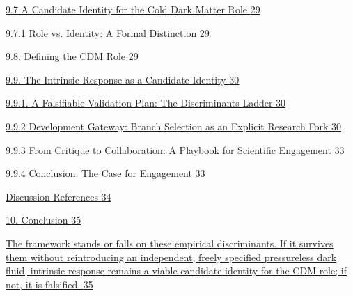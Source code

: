 \documentclass[11pt]{article}
\begin{document}
\hyperref[a-candidate-identity-for-the-cold-dark-matter-role]{9.7 A Candidate Identity for the Cold Dark Matter Role \hyperref[a-candidate-identity-for-the-cold-dark-matter-role]{29}}

\hyperref[role-vs.-identity-a-formal-distinction]{9.7.1 Role vs. Identity: A Formal Distinction \hyperref[role-vs.-identity-a-formal-distinction]{29}}

\hyperref[defining-the-cdm-role]{9.8. Defining the CDM Role \hyperref[defining-the-cdm-role]{29}}

\hyperref[the-intrinsic-response-as-a-candidate-identity]{9.9. The Intrinsic Response as a Candidate Identity \hyperref[the-intrinsic-response-as-a-candidate-identity]{30}}

\hyperref[a-falsifiable-validation-plan-the-discriminants-ladder]{9.9.1. A Falsifiable Validation Plan: The Discriminants Ladder \hyperref[a-falsifiable-validation-plan-the-discriminants-ladder]{30}}

\hyperref[development-gateway-branch-selection-as-an-explicit-research-fork]{9.9.2 Development Gateway: Branch Selection as an Explicit Research Fork \hyperref[development-gateway-branch-selection-as-an-explicit-research-fork]{30}}

\hyperref[from-critique-to-collaboration-a-playbook-for-scientific-engagement]{9.9.3 From Critique to Collaboration: A Playbook for Scientific Engagement \hyperref[from-critique-to-collaboration-a-playbook-for-scientific-engagement]{33}}

\hyperref[conclusion-the-case-for-engagement]{9.9.4 Conclusion: The Case for Engagement \hyperref[conclusion-the-case-for-engagement]{33}}

\hyperref[discussion-references]{Discussion References \hyperref[discussion-references]{34}}

\hyperref[conclusion]{10. Conclusion \hyperref[conclusion]{35}}

\hyperref[the-framework-stands-or-falls-on-these-empirical-discriminants.-if-it-survives-them-without-reintroducing-an-independent-freely-specified-pressureless-dark-fluid-intrinsic-response-remains-a-viable-candidate-identity-for-the-cdm-role-if-not-it-is-falsified.]{The framework stands or falls on these empirical discriminants. If it survives them without reintroducing an independent, freely specified pressureless dark fluid, intrinsic response remains a viable candidate identity for the CDM role; if not, it is falsified. \hyperref[the-framework-stands-or-falls-on-these-empirical-discriminants.-if-it-survives-them-without-reintroducing-an-independent-freely-specified-pressureless-dark-fluid-intrinsic-response-remains-a-viable-candidate-identity-for-the-cdm-role-if-not-it-is-falsified.]{35}}
\end{document}
